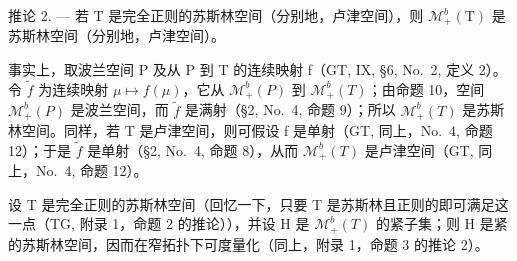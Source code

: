 推论 2. --- 若 T 是完全正则的苏斯林空间（分别地，卢津空间），则 \(\mathcal{M}_{+}^{b}(\mathrm{T})\) 是苏斯林空间（分别地，卢津空间）。

事实上，取波兰空间 P 及从 P 到 T 的连续映射 f（GT, IX, §6, No.~2, 定义 2）。令 \(\widetilde{f}\) 为连续映射 \(\mu\mapsto f(\mu)\)，它从 \(\mathcal{M}_{+}^{b}(P)\) 到 \(\mathcal{M}_{+}^{b}(T)\)；由命题 10，空间 \(\mathcal{M}_{+}^{b}(P)\) 是波兰空间，而 \(\widetilde{f}\) 是满射（§2, No.~4, 命题 9）；所以 \(\mathcal{M}_{+}^{b}(T)\) 是苏斯林空间。同样，若 T 是卢津空间，则可假设 f 是单射（GT, 同上，No.~4, 命题 12）；于是 \(\widetilde{f}\) 是单射（§2, No.~4, 命题 8），从而 \(\mathcal{M}_{+}^{b}(T)\) 是卢津空间（GT, 同上，No.~4, 命题 12）。

设 T 是完全正则的苏斯林空间（回忆一下，只要 T 是苏斯林且正则的即可满足这一点（TG, 附录 1，命题 2 的推论）），并设 H 是 \(\mathcal{M}_{+}^{b}(T)\) 的紧子集；则 H 是紧的苏斯林空间，因而在窄拓扑下可度量化（同上，附录 1，命题 3 的推论 2）。

